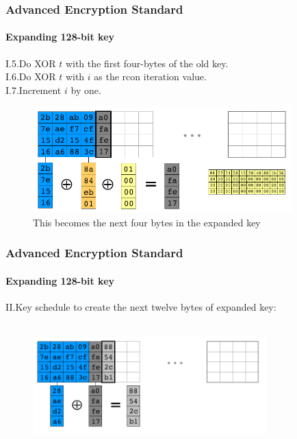 \begin{frame}
	\frametitle{Advanced Encryption Standard}
	\framesubtitle{Expanding 128-bit key}
	{\normalsize
	{I.5.Do XOR $t$ with the first four-bytes of the old key.}\\
    {I.6.Do XOR $t$ with $i$ as the rcon iteration value.}\\
   	{I.7.Increment $i$ by one.}\\
	}
	\begin{figure}
		\vfill
		\centering
		\includegraphics[width=10cm]{keysch3}
		\caption{This becomes the next four bytes in the expanded key}
		\label{fig:obrazek keysch3}
	\end{figure}
\end{frame}

\begin{frame}
	\frametitle{Advanced Encryption Standard}
	\framesubtitle{Expanding 128-bit key}
	{\normalsize
	{II.Key schedule to create the next twelve bytes of expanded key:}\\
    \hspace{0.4cm}{II.1.Assign the value of the previous four bytes in the temporary key to $t$.}\\
    \hspace{0.4cm}{II.2 Do XOR $t$ with the four-byte block 16 bytes before the new expanded key. Repeat three times.} 
	}
	\begin{figure}
		\centering
		\includegraphics[width=9cm]{keysch7}
		\label{fig:obrazek keysch7}
	\end{figure}
\end{frame}

